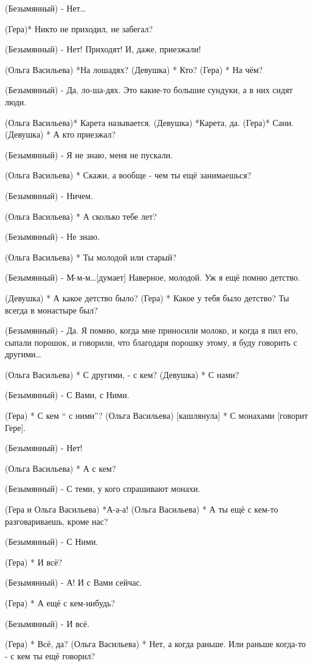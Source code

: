 (Безымянный) - Нет…

(Гера)* Никто не приходил, не забегал?

(Безымянный) - Нет! Приходят!  И, даже, приезжали! 

(Ольга Васильева) *На лошадях?
(Девушка) * Кто?
(Гера) * На чём?

(Безымянный) - Да, ло-ша-дях. Это какие-то большие сундуки, а в них сидят люди.

(Ольга Васильева)*  Карета называется.
(Девушка) *Карета, да.
(Гера)*  Сани.
(Девушка) * А кто приезжал?

(Безымянный) - Я не знаю, меня не пускали.

(Ольга Васильева) * Скажи, а вообще - чем ты ещё занимаешься?

(Безымянный) - Ничем.

(Ольга Васильева) * А сколько тебе лет?

(Безымянный) - Не знаю.

(Ольга Васильева) * Ты молодой или старый?

(Безымянный) - М-м-м…[думает] Наверное, молодой. Уж я ещё помню детство.

(Девушка) * А какое детство было?
(Гера) * Какое у тебя  было детство? Ты всегда в монастыре был?

(Безымянный) - Да. Я помню, когда мне приносили молоко, и когда я пил его, сыпали порошок, и говорили, что благодаря порошку этому, я буду говорить с другими… 

(Ольга Васильева) * С другими, - с кем?
(Девушка) * С нами?

(Безымянный) - С Вами, с Ними.

(Гера) * С кем  “ с ними”?
(Ольга Васильева) [кашлянула] * С монахами [говорит Гере].

(Безымянный) - Нет!

(Ольга Васильева) * А с кем?

(Безымянный) - С теми, у кого спрашивают монахи.

(Гера и Ольга Васильева)  *А-а-а!
(Ольга Васильева) * А ты ещё с кем-то разговариваешь, кроме нас?

(Безымянный) - С Ними.

(Гера) * И всё?

(Безымянный) - А! И с Вами сейчас.

(Гера) * А ещё с кем-нибудь?

(Безымянный) - И всё.

(Гера) * Всё, да?
(Ольга Васильева) * Нет, а когда раньше. Или раньше когда-то - с кем ты ещё говорил?

